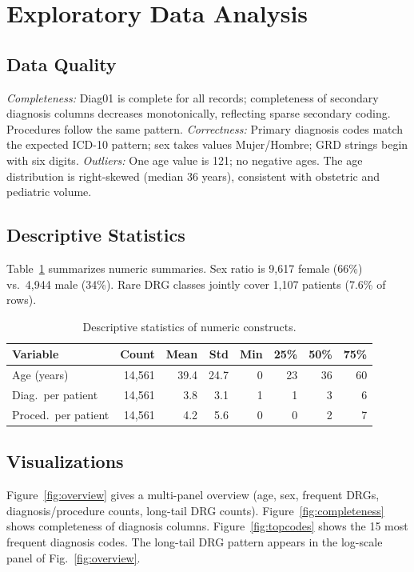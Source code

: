 \documentclass{ieeeaccess}
\begin{document}
\section{Exploratory Data Analysis}
\label{sec:eda}

\subsection{Data Quality}
\emph{Completeness:} Diag01 is complete for all records; completeness of secondary diagnosis columns decreases monotonically, reflecting sparse secondary coding. Procedures follow the same pattern. \emph{Correctness:} Primary diagnosis codes match the expected ICD-10 pattern; sex takes values Mujer/Hombre; GRD strings begin with six digits. \emph{Outliers:} One age value is 121; no negative ages. The age distribution is right-skewed (median 36 years), consistent with obstetric and pediatric volume.

\subsection{Descriptive Statistics}
Table~\ref{tab:desc} summarizes numeric summaries. Sex ratio is 9{,}617 female (66\%) vs.\ 4{,}944 male (34\%). Rare DRG classes jointly cover 1{,}107 patients (7.6\% of rows).

\begin{table}[!t]
\caption{Descriptive statistics of numeric constructs.}
\label{tab:desc}
\centering
{\footnotesize
\begin{tabular}{lrrrrrrr}
\hline
Variable & Count & Mean & Std & Min & 25\% & 50\% & 75\% \\
\hline
Age (years) & 14{,}561 & 39.4 & 24.7 & 0 & 23 & 36 & 60 \\
Diag.\ per patient & 14{,}561 & 3.8 & 3.1 & 1 & 1 & 3 & 6 \\
Proced.\ per patient & 14{,}561 & 4.2 & 5.6 & 0 & 0 & 2 & 7 \\
\hline
\end{tabular}}
\end{table}

\subsection{Visualizations}
Figure~\ref{fig:overview} gives a multi-panel overview (age, sex, frequent DRGs, diagnosis/procedure counts, long-tail DRG counts). Figure~\ref{fig:completeness} shows completeness of diagnosis columns. Figure~\ref{fig:topcodes} shows the 15 most frequent diagnosis codes. The long-tail DRG pattern appears in the log-scale panel of Fig.~\ref{fig:overview}.
\end{document}
